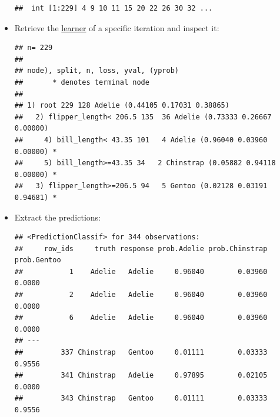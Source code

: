 \documentclass[
]{scrbook}
\newenvironment{Shaded}{\begin{snugshade}}{\end{snugshade}}
\newcommand{\CommentTok}[1]{\textcolor[rgb]{0.56,0.35,0.01}{\textit{#1}}}
\newcommand{\DecValTok}[1]{\textcolor[rgb]{0.00,0.00,0.81}{#1}}
\newcommand{\FunctionTok}[1]{\textcolor[rgb]{0.00,0.00,0.00}{#1}}
\newcommand{\NormalTok}[1]{#1}
\newcommand{\OtherTok}[1]{\textcolor[rgb]{0.56,0.35,0.01}{#1}}
\newcommand{\SpecialCharTok}[1]{\textcolor[rgb]{0.00,0.00,0.00}{#1}}
\renewenvironment{Shaded} {\begin{snugshade}\small} {\end{snugshade}}
\begin{document}
\begin{itemize}
\begin{verbatim}
##  int [1:229] 4 9 10 11 15 20 22 26 30 32 ...
\end{verbatim}
\item
  Retrieve the \protect\hyperlink{learners}{learner} of a specific iteration and inspect it:

\begin{Shaded}
\end{Shaded}

\begin{verbatim}
## n= 229 
## 
## node), split, n, loss, yval, (yprob)
##       * denotes terminal node
## 
## 1) root 229 128 Adelie (0.44105 0.17031 0.38865)  
##   2) flipper_length< 206.5 135  36 Adelie (0.73333 0.26667 0.00000)  
##     4) bill_length< 43.35 101   4 Adelie (0.96040 0.03960 0.00000) *
##     5) bill_length>=43.35 34   2 Chinstrap (0.05882 0.94118 0.00000) *
##   3) flipper_length>=206.5 94   5 Gentoo (0.02128 0.03191 0.94681) *
\end{verbatim}
\item
  Extract the predictions:

\begin{Shaded}
\end{Shaded}

\begin{verbatim}
## <PredictionClassif> for 344 observations:
##     row_ids     truth response prob.Adelie prob.Chinstrap prob.Gentoo
##           1    Adelie   Adelie     0.96040        0.03960      0.0000
##           2    Adelie   Adelie     0.96040        0.03960      0.0000
##           6    Adelie   Adelie     0.96040        0.03960      0.0000
## ---                                                                  
##         337 Chinstrap   Gentoo     0.01111        0.03333      0.9556
##         341 Chinstrap   Adelie     0.97895        0.02105      0.0000
##         343 Chinstrap   Gentoo     0.01111        0.03333      0.9556
\end{verbatim}


\end{itemize}
\end{document}
